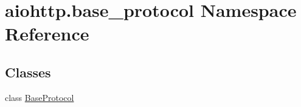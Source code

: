 \hypertarget{namespaceaiohttp_1_1base__protocol}{}\section{aiohttp.\+base\+\_\+protocol Namespace Reference}
\label{namespaceaiohttp_1_1base__protocol}
\subsection*{Classes}
\begin{DoxyCompactItemize}
\item 
class \hyperlink{classaiohttp_1_1base__protocol_1_1_base_protocol}{Base\+Protocol}
\end{DoxyCompactItemize}
